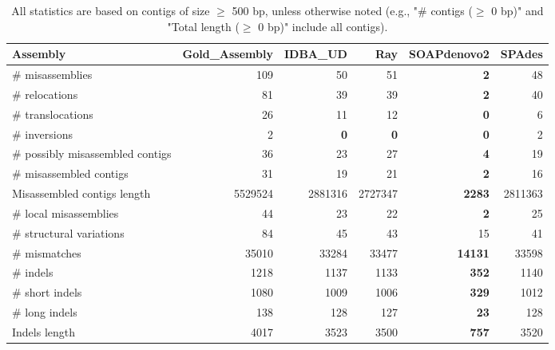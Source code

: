 \documentclass[12pt,a4paper]{article}
\begin{document}
\begin{table}[ht]
\begin{center}
\caption{All statistics are based on contigs of size $\geq$ 500 bp, unless otherwise noted (e.g., "\# contigs ($\geq$ 0 bp)" and "Total length ($\geq$ 0 bp)" include all contigs).}
\begin{tabular}{|l*{5}{|r}|}
\hline
Assembly & Gold\_Assembly & IDBA\_UD & Ray & SOAPdenovo2 & SPAdes \\ \hline
\# misassemblies & 109 & 50 & 51 & {\bf 2} & 48 \\ \hline
\hspace{5mm}\# relocations & 81 & 39 & 39 & {\bf 2} & 40 \\ \hline
\hspace{5mm}\# translocations & 26 & 11 & 12 & {\bf 0} & 6 \\ \hline
\hspace{5mm}\# inversions & 2 & {\bf 0} & {\bf 0} & {\bf 0} & 2 \\ \hline
\# possibly misassembled contigs & 36 & 23 & 27 & {\bf 4} & 19 \\ \hline
\# misassembled contigs & 31 & 19 & 21 & {\bf 2} & 16 \\ \hline
Misassembled contigs length & 5529524 & 2881316 & 2727347 & {\bf 2283} & 2811363 \\ \hline
\# local misassemblies & 44 & 23 & 22 & {\bf 2} & 25 \\ \hline
\# structural variations & 84 & 45 & 43 & 15 & 41 \\ \hline
\# mismatches & 35010 & 33284 & 33477 & {\bf 14131} & 33598 \\ \hline
\# indels & 1218 & 1137 & 1133 & {\bf 352} & 1140 \\ \hline
\hspace{5mm}\# short indels & 1080 & 1009 & 1006 & {\bf 329} & 1012 \\ \hline
\hspace{5mm}\# long indels & 138 & 128 & 127 & {\bf 23} & 128 \\ \hline
Indels length & 4017 & 3523 & 3500 & {\bf 757} & 3520 \\ \hline
\end{tabular}
\end{center}
\end{table}
\end{document}
